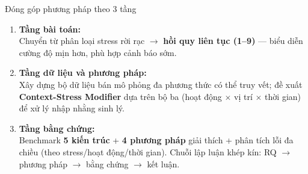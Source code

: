 \documentclass[11pt]{beamer}
\begin{document}
\begin{frame}{Đóng góp phương pháp theo 3 tầng}
\small
\begin{enumerate}
    \item \textbf{Tầng bài toán:}\\
    Chuyển từ phân loại stress rời rạc $\rightarrow$ \textbf{hồi quy liên tục (1--9)} --- biểu diễn cường độ mịn hơn, phù hợp cảnh báo sớm.

    \vspace{0.15cm}
    \item \textbf{Tầng dữ liệu và phương pháp:}\\
    Xây dựng bộ dữ liệu bán mô phỏng đa phương thức có thể truy vết; đề xuất \textbf{Context-Stress Modifier} dựa trên bộ ba (hoạt động $\times$ vị trí $\times$ thời gian) để xử lý nhập nhằng sinh lý.

    \vspace{0.15cm}
    \item \textbf{Tầng bằng chứng:}\\
    Benchmark \textbf{5 kiến trúc} + \textbf{4 phương pháp} giải thích + phân tích lỗi đa chiều (theo stress/hoạt động/thời gian). Chuỗi lập luận khép kín: RQ $\rightarrow$ phương pháp $\rightarrow$ bằng chứng $\rightarrow$ kết luận.
\end{enumerate}

\vspace{0.1cm}
\end{frame}
\end{document}
